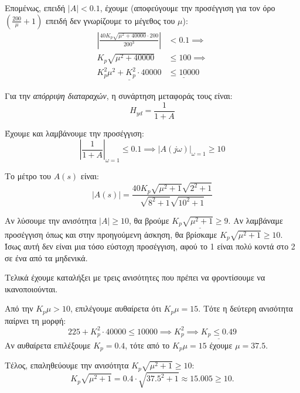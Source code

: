 \documentclass[11pt,a4paper,notitlepage,fleqn,final]{article}
\begin{document}
\begin{exercise}
Επομένως, επειδή \( |A| < 0.1 \), έχουμε (αποφεύγουμε την προσέγγιση για τον όρο
\( \left(\frac{200}{μ}+1\right) \) επειδή δεν γνωρίζουμε το μέγεθος του \( μ \)):
\begin{align*}
	\left|
	\frac{40K_p\sqrt{μ^2+40000}\cdot 200}{200^3}
	\right| &< 0.1 \implies \\
	K_p \sqrt{μ^2 + 40000} &\leq 100 \implies \\
	\underline{K_p^2μ^2+K_p^2\cdot 40000}& \underline{\leq 10000}
\end{align*}

Για την \textit{απόρριψη διαταραχών}, η συνάρτηση μεταφοράς τους είναι:
\[
H_{yd} = \frac{1}{1+A}
\]

Έχουμε και λαμβάνουμε την προσέγγιση:
\[
\left|\frac{1}{1+A}\right|_{\omega = 1} \leq 0.1
\implies |A(j\omega )|_{\omega =1} \geq 10
\]

Το μέτρο του \( A(s) \) είναι:
\[
\left|A(s)\right|
= \frac{40K_p \sqrt{μ^2+1}\sqrt{2^2+1}}{\sqrt{8^2+1}\sqrt{10^2+1}}
\]

Αν λύσουμε την ανισότητα \( |A|\geq 10 \), θα βρούμε \( \underline{K_p\sqrt{μ^2+1} \geq 9} \).
Αν λαμβάναμε προσέγγιση όπως και στην προηγούμενη άσκηση, θα βρίσκαμε \( K_p\sqrt{μ^2+1} \geq 10 \). Ίσως αυτή δεν είναι μια τόσο εύστοχη
προσέγγιση, αφού το 1 είναι πολύ κοντά στο 2 σε ένα από τα μηδενικά.

Τελικά έχουμε καταλήξει με τρεις ανισότητες που πρέπει να φροντίσουμε να ικανοποιούνται.

Από την \( K_p μ > 10 \), επιλέγουμε αυθαίρετα ότι \( K_pμ = 15 \). Τότε η δεύτερη
ανισότητα παίρνει τη μορφή:
\[
225 + K_p^2\cdot 40000 \leq 10000
\implies K_p^2 \implies \underline{K_p \leq 0.49}
\]
Αν αυθαίρετα επιλέξουμε \( K_p = 0.4 \), τότε από το \( K_p μ=15 \) έχουμε \( μ=37.5 \).

Τέλος, επαληθεύουμε την ανισότητα \( K_p\sqrt{μ^2+1} \geq 10 \):
\[
K_p\sqrt{μ^2+1}
= 0.4\cdot \sqrt{37.5^2 + 1} \approx 15.005 \geq 10.
\]

\end{exercise}
\end{document}
